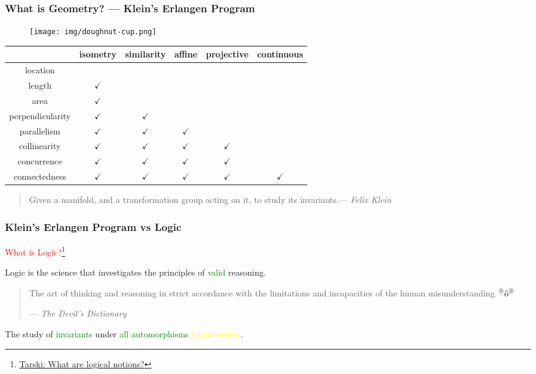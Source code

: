 \documentclass[UTF8,aspectratio=43,11pt,colorlinks,compress,openany]{beamer}%
\begin{document}
\begin{frame}\frametitle{What is Geometry? --- Klein's Erlangen Program}\vspace{-1ex}
\begin{figure}[H]
\texttt{[image: img/doughnut-cup.png]}
\end{figure}\vspace{-4ex}
	\begin{table}
		\begin{tabu}{c|c|c|c|c|c}
			\hline
		 & isometry & similarity & affine & projective & continuous\\
			\hline
			location & & & & &\\
			\hline
			length & $\checkmark$ & & & &\\
			\hline
			area & $\checkmark$ & & & &\\
			\hline
			perpendicularity & $\checkmark$ & $\checkmark$ & & &\\
			\hline
			parallelism & $\checkmark$ & $\checkmark$ & $\checkmark$ & &\\
			\hline
			collinearity & $\checkmark$ & $\checkmark$ & $\checkmark$ & $\checkmark$ &\\
			\hline
			concurrence & $\checkmark$ & $\checkmark$ & $\checkmark$ & $\checkmark$ &\\
			\hline
			connectedness & $\checkmark$ & $\checkmark$ & $\checkmark$ & $\checkmark$ & $\checkmark$\\
			\hline
		\end{tabu}
	\end{table}\vspace{-1ex}
	\begin{quote}
	Given a manifold, and a transformation group acting on it, to study its invariants.\hfill --- \textsl{Felix Klein}
	\end{quote}
\end{frame}

\begin{frame}\frametitle{Klein's Erlangen Program vs Logic}
	\centerline{\textcolor{red}{\Large What is Logic?}\footnote{\href{https://www.tandfonline.com/doi/abs/10.1080/01445348608837096}{Tarski: What are logical notions?}}}
	\begin{block}{}
		Logic is the science that investigates the principles of \textcolor{green}{valid} reasoning.
	\end{block}
	\centering{}
	\begin{quote}
		The art of thinking and reasoning in strict accordance with the limitations and incapacities of the human misunderstanding.\textcolor{red}{$\sideset{^\circledcirc}{^\circledcirc}{\operatorname{\hat{o}}}$}\par\hfill --- \textsl{The Devil's Dictionary}
	\end{quote}
	\begin{block}{}\centering
		The study of \textcolor{green}{invariants} under \textcolor{green}{all automorphisms} \textcolor{yellow}{(symmetries)}.
	\end{block}
\end{frame}
\end{document}
